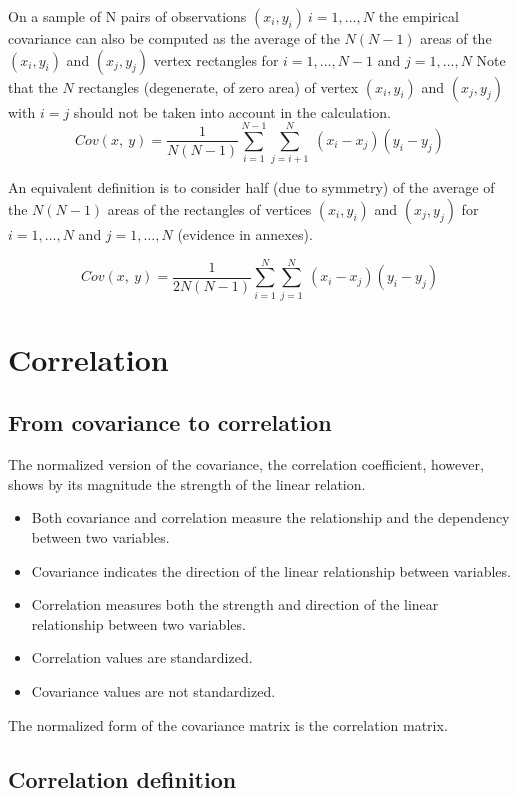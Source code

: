\documentclass[
]{report}
\providecommand{\tightlist}{%
  \setlength{\itemsep}{0pt}\setlength{\parskip}{0pt}}
\begin{document}
On a sample of N pairs of observations \((x_i,y_i)~i=1,\dots, N\) the empirical covariance can also be computed as the average of the \(N(N-1)\) areas of the \((x_i,y_i)\) and \((x_j,y_j)\) vertex rectangles for \(i=1,\dots, N-1\) and \(j=1,\dots, N\)
Note that the \(N\) rectangles (degenerate, of zero area) of vertex \((x_i,y_i)\) and \((x_j,y_j)\) with \(i=j\) should not be taken into account in the calculation.
\[Cov(x,~y)=\frac{1}{N(N-1)}\sum_{i=1}^{N-1} \sum_{j=i+1}^{N}~(x_i-x_j)(y_i-y_j)\]

An equivalent definition is to consider half (due to symmetry) of the average of the \(N(N-1)\) areas of the rectangles of vertices \((x_i,y_i)\) and \((x_j,y_j)\) for \(i=1,\dots, N\) and \(j=1,\dots, N\) (evidence in annexes).

\[Cov(x,~y)=\frac{1}{2N(N-1)}
\sum_{i=1}^{N} \sum_{j=1}^{N}~(x_i-x_j)(y_i-y_j)\]

\hypertarget{correlation}{%
\chapter{Correlation}\label{correlation}}

\hypertarget{from-covariance-to-correlation}{%
\section{From covariance to correlation}\label{from-covariance-to-correlation}}

The normalized version of the covariance, the correlation coefficient, however, shows by its magnitude the strength of the linear relation.

\begin{itemize}
\tightlist
\item
  Both covariance and correlation measure the relationship and the dependency between two variables.
\item
  Covariance indicates the direction of the linear relationship between variables.
\item
  Correlation measures both the strength and direction of the linear relationship between two variables.
\item
  Correlation values are standardized.
\item
  Covariance values are not standardized.
\end{itemize}

The normalized form of the covariance matrix is the correlation matrix.

\hypertarget{correlation-definition}{%
\section{Correlation definition}\label{correlation-definition}}
\end{document}

